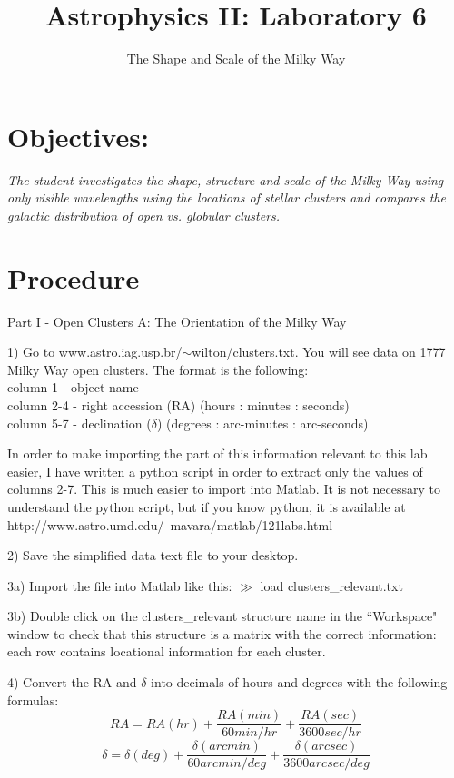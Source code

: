 \documentclass[11pt]{article}
\begin{document}
\title{Astrophysics II: Laboratory 6}
\author{\Large The Shape and Scale of the Milky Way}
\maketitle

\setlength{\parindent}{0.2pt}
\setlength{\parskip}{2ex}

\section{{\bf Objectives:}}

{\it The student investigates the shape, structure and scale of the
 Milky Way using only visible wavelengths using the locations of stellar clusters and compares the galactic distribution of open vs. globular clusters.}


\section{{\bf Procedure}}


Part I - Open Clusters A: The Orientation of the Milky Way

1) Go to www.astro.iag.usp.br/$\sim$wilton/clusters.txt.  You will see data
on 1777 Milky Way open clusters.  The format is the following:\\
column 1 - object name\\
column 2-4 - right accession (RA) (hours : minutes : seconds)\\
column 5-7 - declination ($\delta$) (degrees : arc-minutes : arc-seconds)

In order to make importing the part of this information relevant to this lab easier, I have written a python script in order to extract only the values of columns 2-7. This is much easier to import into Matlab. It is not necessary to understand the python script, but if you know python, it is available at http://www.astro.umd.edu/~mavara/matlab/121labs.html

2) Save the simplified data text file to your desktop.

3a) Import the file into Matlab like this:
$\gg$ load clusters\_relevant.txt

3b) Double click on the clusters\_relevant structure name in the ``Workspace" window to check that this structure is a matrix with the correct information: each row contains locational information for each cluster.

4) Convert the RA and $\delta$ into decimals of hours and degrees with the
following formulas:
\begin{equation}
RA = RA(hr) + \frac{RA(min)}{60 min/hr} + \frac{RA(sec)}{3600 sec/hr} 
\end{equation}
\begin{equation}
\delta = \delta(deg) + \frac{\delta(arcmin)}{60 arcmin/deg} + \frac{\delta(arcsec)}{3600 arcsec/deg}
\end{equation}
\end{document}
